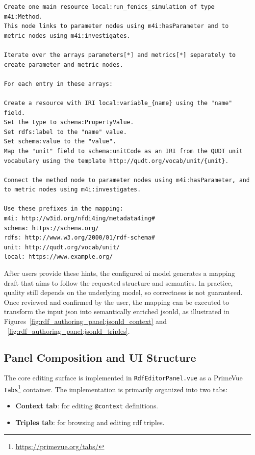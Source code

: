 \begin{lstlisting}[float=htbp,style=plaintext,basicstyle=\ttfamily\fontsize{7}{8}\selectfont\color{black},caption={Sample RML hints which describe the mapping from JSON in~\ref{lst:background_json_example} to JSON-LD in~\ref{lst:background_jsonld_example}}, label={lst:metaconfigurator_interface_rdf:rml_hint_complex}]
Create one main resource local:run_fenics_simulation of type m4i:Method.
This node links to parameter nodes using m4i:hasParameter and to metric nodes using m4i:investigates.

Iterate over the arrays parameters[*] and metrics[*] separately to create parameter and metric nodes.

For each entry in these arrays:

Create a resource with IRI local:variable_{name} using the "name" field.
Set the type to schema:PropertyValue.
Set rdfs:label to the "name" value.
Set schema:value to the "value".
Map the "unit" field to schema:unitCode as an IRI from the QUDT unit vocabulary using the template http://qudt.org/vocab/unit/{unit}.

Connect the method node to parameter nodes using m4i:hasParameter, and to metric nodes using m4i:investigates.

Use these prefixes in the mapping:
m4i: http://w3id.org/nfdi4ing/metadata4ing#
schema: https://schema.org/
rdfs: http://www.w3.org/2000/01/rdf-schema#
unit: http://qudt.org/vocab/unit/
local: https://www.example.org/
\end{lstlisting}

\newpage

After users provide these hints, the configured \gls{ai} model generates a mapping draft that aims to follow the requested structure and semantics. In practice, quality still depends on the underlying model, so correctness is not guaranteed. Once reviewed and confirmed by the user, the mapping can be executed to transform the input \gls{json} into semantically enriched \gls{jsonld}, as illustrated in Figures~\ref{fig:rdf_authoring_panel:jsonld_context} and ~\ref{fig:rdf_authoring_panel:jsonld_triples}.

\subsection{Panel Composition and UI Structure}
\label{sec:design:rdf-authoring-panel:panel-composition}

The core editing surface is implemented in \texttt{RdfEditorPanel.vue} as a PrimeVue \texttt{Tabs}\footnote{\url{https://primevue.org/tabs/}} container. The implementation is primarily organized into two tabs:
\begin{itemize}
    \item \textbf{Context tab}: for editing \texttt{@context} definitions.
    \item \textbf{Triples tab}: for browsing and editing \gls{rdf} triples.
\end{itemize}

